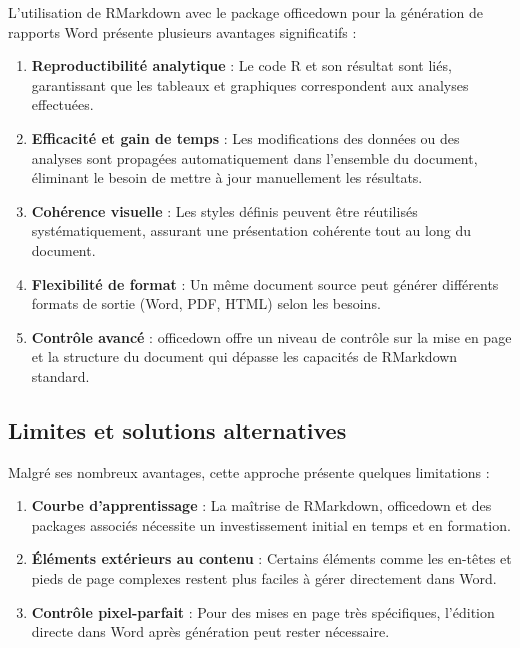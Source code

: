 \documentclass[
]{article}
\begin{document}
L'utilisation de RMarkdown avec le package officedown pour la génération
de rapports Word présente plusieurs avantages significatifs :

\begin{enumerate}
\def\labelenumi{\arabic{enumi}.}
\item
  \textbf{Reproductibilité analytique} : Le code R et son résultat sont
  liés, garantissant que les tableaux et graphiques correspondent aux
  analyses effectuées.
\item
  \textbf{Efficacité et gain de temps} : Les modifications des données
  ou des analyses sont propagées automatiquement dans l'ensemble du
  document, éliminant le besoin de mettre à jour manuellement les
  résultats.
\item
  \textbf{Cohérence visuelle} : Les styles définis peuvent être
  réutilisés systématiquement, assurant une présentation cohérente tout
  au long du document.
\item
  \textbf{Flexibilité de format} : Un même document source peut générer
  différents formats de sortie (Word, PDF, HTML) selon les besoins.
\item
  \textbf{Contrôle avancé} : officedown offre un niveau de contrôle sur
  la mise en page et la structure du document qui dépasse les capacités
  de RMarkdown standard.
\end{enumerate}

\subsection{Limites et solutions
alternatives}\label{limites-et-solutions-alternatives}

Malgré ses nombreux avantages, cette approche présente quelques
limitations :

\begin{enumerate}
\def\labelenumi{\arabic{enumi}.}
\item
  \textbf{Courbe d'apprentissage} : La maîtrise de RMarkdown, officedown
  et des packages associés nécessite un investissement initial en temps
  et en formation.
\item
  \textbf{Éléments extérieurs au contenu} : Certains éléments comme les
  en-têtes et pieds de page complexes restent plus faciles à gérer
  directement dans Word.
\item
  \textbf{Contrôle pixel-parfait} : Pour des mises en page très
  spécifiques, l'édition directe dans Word après génération peut rester
  nécessaire.
\end{enumerate}
\end{document}
